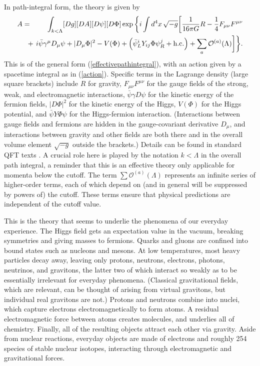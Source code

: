 \documentclass[12pt,letterpaper]{article}
\newcommand{\bea}{\begin{eqnarray}}
\newcommand{\eea}{\end{eqnarray}}
\begin{document}
In path-integral form, the theory is given by
\bea
A &=& \displaystyle\int_{k < \Lambda} [Dg][DA][D\psi][D\Phi]\exp\bigg\{i \int d^4x\,\sqrt{-g}\bigg[\frac{1}{16\pi G}R - \frac{1}{4}F_{\mu\nu}F^{\mu\nu} 
\nonumber \\&& 
{\hskip-15pt}+\, i\bar\psi\gamma^\mu D_\mu \psi + |D_\mu\Phi|^2 -V(\Phi) + \left(\bar\psi^i_L Y_{ij}\Phi\psi^j_R + \mathrm{h.c.}\right) + \sum_a \mathcal{O}^{(a)}(\Lambda) \bigg]\bigg\}.
\label{coretheory}
\eea
This is of the general form (\ref{effectivepathintegral}), with an action given by a spacetime integral as in (\ref{action}).
Specific terms in the Lagrange density (large square brackets) include $R$ for gravity, $F_{\mu\nu}F^{\mu\nu}$ for the gauge fields of the strong, weak, and electromagnetic interactions, $\bar\psi \gamma D \psi$ for the kinetic energy of the fermion fields, $|D\Phi|^2$ for the kinetic energy of the Higgs, $V(\Phi)$ for the Higgs potential, and $\bar\psi Y\Phi\psi$ for the Higgs-fermion interaction.
(Interactions between gauge fields and fermions are hidden in the gauge-covariant derivative $D_\mu$, and interactions between gravity and other fields are both there and in the overall volume element $\sqrt{-g}$ outside the brackets.)
Details can be found in standard QFT texts \citep{peskin2015introduction}.
A crucial role here is played by the notation $k<\Lambda$ in the overall path integral, a reminder that this is an effective theory only applicable for momenta below the cutoff.
The term $\sum\mathcal{O}^{(a)}(\Lambda)$ represents an infinite series of higher-order terms, each of which depend on (and in general will be suppressed by powers of) the cutoff.
These terms ensure that physical predictions are independent of the cutoff value.

This is the theory that seems to underlie the phenomena of our everyday experience.
The Higgs field gets an expectation value in the vacuum, breaking symmetries and giving masses to fermions.
Quarks and gluons are confined into bound states such as nucleons and mesons.
At low temperatures, most heavy particles decay away, leaving only protons, neutrons, electrons, photons, neutrinos, and gravitons, the latter two of which interact so weakly as to be essentially irrelevant for everyday phenomena.
(Classical gravitational fields, which are relevant, can be thought of arising from virtual gravitons, but individual real gravitons are not.)
Protons and neutrons combine into nuclei, which capture electrons electromagnetically to form atoms.
A residual electromagnetic force between atoms creates molecules, and underlies all of chemistry.
Finally, all of the resulting objects attract each other via gravity.
Aside from nuclear reactions, everyday objects are made of electrons and roughly 254 species of stable nuclear isotopes, interacting through electromagnetic and gravitational forces.
\end{document}
